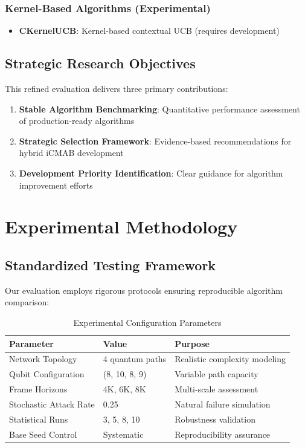 \documentclass[12pt,a4paper]{article}
\begin{document}
\subsubsection{Kernel-Based Algorithms (Experimental)}
\begin{itemize}
\item \textbf{CKernelUCB}: Kernel-based contextual UCB (requires development)
\end{itemize}

\subsection{Strategic Research Objectives}

This refined evaluation delivers three primary contributions:

\begin{enumerate}
\item \textbf{Stable Algorithm Benchmarking}: Quantitative performance assessment of production-ready algorithms
\item \textbf{Strategic Selection Framework}: Evidence-based recommendations for hybrid iCMAB development
\item \textbf{Development Priority Identification}: Clear guidance for algorithm improvement efforts
\end{enumerate}

\section{Experimental Methodology}

\subsection{Standardized Testing Framework}

Our evaluation employs rigorous protocols ensuring reproducible algorithm comparison:

\begin{table}[H]
\centering
\caption{Experimental Configuration Parameters}
\begin{tabular}{|l|l|l|}
\hline
\textbf{Parameter} & \textbf{Value} & \textbf{Purpose} \\
\hline
\hline
Network Topology & 4 quantum paths & Realistic complexity modeling \\
Qubit Configuration & (8, 10, 8, 9) & Variable path capacity \\
Frame Horizons & 4K, 6K, 8K & Multi-scale assessment \\
Stochastic Attack Rate & 0.25 & Natural failure simulation \\
Statistical Runs & 3, 5, 8, 10 & Robustness validation \\
Base Seed Control & Systematic & Reproducibility assurance \\
\hline
\end{tabular}
\end{table}
\end{document}
